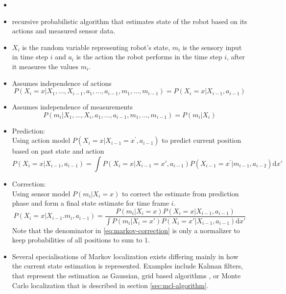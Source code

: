 \begin{itemize}
\item \cite{fox98,diard}
\item recursive probabilistic algorithm that estimates state of the robot based
	on its actions and measured sensor data.
\item \(X_i\) is the random variable representing robot's state,
	\(m_i\) is the sensory input in time step \(i\) and \(a_i\) is the action the
	robot performs in the time step \(i\), after it measures the values \(m_i\).
\item Assumes independence of actions
	\begin{equation}
		P(X_i = x | X_1, \dotsc, X_{i - 1}, a_1, \dotsc, a_{i - 1},
		m_1, \dotsc, m_{i - 1}) = 
		P(X_i = x | X_{i - 1}, a_{i - 1})
	\end{equation}
\item Assumes independence of measurements
	\begin{equation}
		P(m_i | X_1, \dotsc, X_i, a_1, \dotsc, a_{i - 1},
		m_1, \dotsc, m_{i - 1}) = 
		P(m_i | X_i)
	\end{equation}
\item Prediction:\\
	Using action model \(P(X_i = x | X_{i-1} = x^\prime, a_{i - 1})\) to predict
	current position based on past state and action
	\begin{equation}
		\label{eq:markov-prediction}
		P(X_i = x | X_{i - 1}, a_{i - 1}) =
		\int
		P(X_i = x | X_{i - 1} = x', a_{i - 1})
		P(X_{i - 1} = x^\prime | m_{i - 1}, a_{i - 2})
		\mathrm{d}x'
	\end{equation}

\item Correction:\\
	Using sensor model \(P(m_i | X_i = x)\) to correct the estimate from prediction phase
	and form a final state estimate for time frame \(i\).
	\begin{equation}
		\label{eq:markov-correction}
		P(X_i = x | X_{i-1}. m_i, a_{i - 1}) =
		\frac
			{P(m_i | X_i = x) P(X_i = x | X_{i - 1}, a_{i - 1})}
			{
			\int
			P(m_i | X_i = x') P(X_i = x' | X_{i - 1}, a_{i - 1})
			\mathrm{d}x'
			}
	\end{equation}
	Note that the denominator in \eqref{eq:markov-correction} is only a normalizer to
	keep probabilities of all positions to sum to \(1\). 
\item Several specialisations of Markov localization exists differing mainly in how the
	current state estimation is represented.
	Examples include Kalman filters, that represent the estimation as Gaussian,
	grid based algorithms \cite{fox98}, or Monte Carlo localization
	that is described in section \ref{sec:mcl-algorithm}.
\end{itemize}

